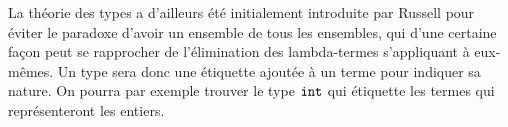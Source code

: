La théorie des types a d'ailleurs été initialement introduite par Russell pour éviter le paradoxe d'avoir un ensemble de tous les ensembles, qui d'une certaine façon peut se rapprocher de l'élimination des lambda-termes s'appliquant à eux-mêmes. Un type sera donc une étiquette ajoutée à un terme pour indiquer sa nature. On pourra par exemple trouver le type $\texttt{int}$ qui étiquette les termes qui représenteront les entiers.



